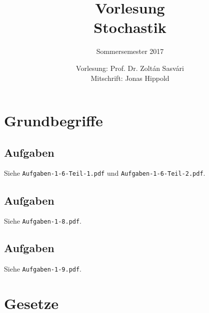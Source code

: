 \documentclass[
 a4paper,
 12pt,
 parskip=half
 ]{scrreprt}
\title{Vorlesung\\Stochastik}
\subtitle{Sommersemester 2017}
\author{Vorlesung: Prof. Dr. Zoltán Sasvári\\Mitschrift: Jonas Hippold}
\theoremstyle{plain}
\theoremstyle{definition}
\numberwithin{equation}{section}
\begin{document}
\maketitle

\tableofcontents

\clearpage



\chapter{Grundbegriffe}



\clearpage



\clearpage



\clearpage



\clearpage



\section{Aufgaben}
Siehe \verb+Aufgaben-1-6-Teil-1.pdf+ und \verb+Aufgaben-1-6-Teil-2.pdf+.



\section{Aufgaben}
Siehe \verb+Aufgaben-1-8.pdf+.

\section{Aufgaben}
Siehe \verb+Aufgaben-1-9.pdf+.



\chapter{Gesetze}

\end{document}
